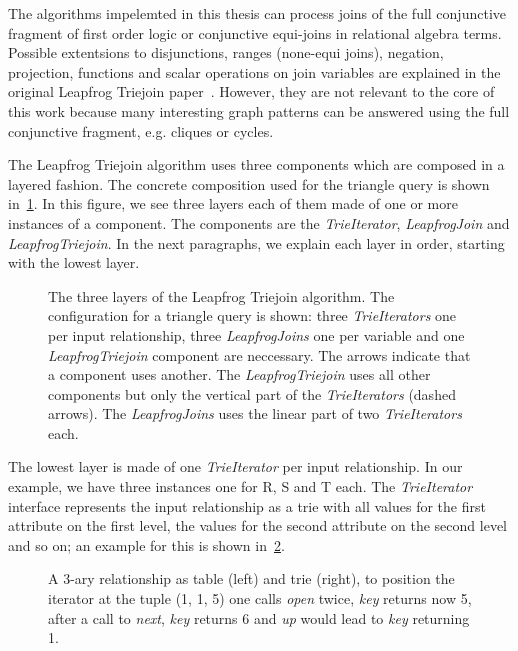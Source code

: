 The algorithms impelemted in this thesis can process joins of the full conjunctive fragment of first order logic or conjunctive
equi-joins in relational algebra terms.
Possible extentsions to disjunctions, ranges (none-equi joins), negation, projection, functions and scalar operations on join variables are
explained in the original Leapfrog Triejoin paper~\cite{lftj}.
However, they are not relevant to the core of this work because many interesting graph patterns can be answered using the full conjunctive
fragment, e.g. cliques or cycles.

The Leapfrog Triejoin algorithm uses three components which are composed in a layered fashion.
The concrete composition used for the triangle query is shown in~\cref{fig:lftj-layers}.
In this figure, we see three layers each of them made of one or more instances of a component.
The components are the \textit{TrieIterator}, \textit{LeapfrogJoin} and \textit{LeapfrogTriejoin}.
In the next paragraphs, we explain each layer in order, starting with the lowest layer.

\begin{figure}
    
    \caption{
    The three layers of the Leapfrog Triejoin algorithm.
    The configuration for a triangle query is shown: three \textit{TrieIterators} one
    per input relationship, three \textit{LeapfrogJoins} one per variable and
    one \textit{LeapfrogTriejoin} component are neccessary.
    The arrows indicate that a component uses another.
    The \textit{LeapfrogTriejoin} uses all other components but only the vertical part of the \textit{TrieIterators} (dashed arrows).
    The \textit{LeapfrogJoins} uses the linear part of two \textit{TrieIterators} each.
    }
    \label{fig:lftj-layers}
\end{figure}

The lowest layer is made of one \textit{TrieIterator} per input relationship.
In our example, we have three instances one for R, S and T each.
The \textit{TrieIterator} interface represents the input relationship as a trie with all values for
the first attribute on the first level, the values for the second attribute on the second level and so
on; an example for this is shown in~\cref{fig:trie-example}.

\begin{figure}
    \centering
    
    \caption{A 3-ary relationship as table (left) and trie (right), to position the iterator at the tuple (1, 1, 5) one
    calls \textit{open} twice, \textit{key} returns now 5, after a call to \textit{next}, \textit{key} returns 6 and \textit{up}
    would lead to \textit{key} returning 1.}
    \label{fig:trie-example}
\end{figure}

